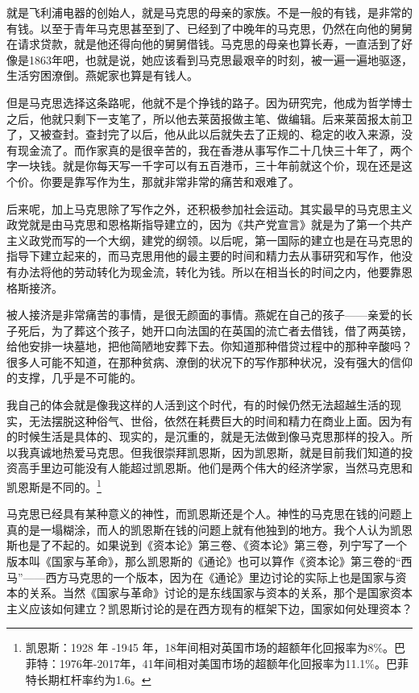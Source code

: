 \documentclass[UTF8, 12pt, a4paper]{ctexrep}
\begin{document}
就是飞利浦电器的创始人，就是马克思的母亲的家族。不是一般的有钱，是非常的有钱。以至于青年马克思甚至到了、已经到了中晚年的马克思，仍然在向他的舅舅在请求贷款，就是他还得向他的舅舅借钱。马克思的母亲也算长寿，一直活到了好像是1863年吧，也就是说，她应该看到马克思最艰辛的时刻，被一遍一遍地驱逐，生活穷困潦倒。燕妮家也算是有钱人。

但是马克思选择这条路呢，他就不是个挣钱的路子。因为研究完，他成为哲学博士之后，他就只剩下一支笔了，所以他去莱茵报做主笔、做编辑。后来莱茵报太前卫了，又被查封。查封完了以后，他从此以后就失去了正规的、稳定的收入来源，没有现金流了。而作家真的是很辛苦的，我在香港从事写作二十几快三十年了，两个字一块钱。就是你每天写一千字可以有五百港币，三十年前就这个价，现在还是这个价。你要是靠写作为生，那就非常非常的痛苦和艰难了。

后来呢，加上马克思除了写作之外，还积极参加社会运动。其实最早的马克思主义政党就是由马克思和恩格斯指导建立的，因为《共产党宣言》就是为了第一个共产主义政党而写的一个大纲，建党的纲领。以后呢，第一国际的建立也是在马克思的指导下建立起来的，而马克思用他的最主要的时间和精力去从事研究和写作，他没有办法将他的劳动转化为现金流，转化为钱。所以在相当长的时间之内，他要靠恩格斯接济。

被人接济是非常痛苦的事情，是很无颜面的事情。燕妮在自己的孩子——亲爱的长子死后，为了葬这个孩子，她开口向法国的在英国的流亡者去借钱，借了两英镑，给他安排一块墓地，把他简陋地安葬下去。你知道那种借贷过程中的那种辛酸吗？很多人可能不知道，在那种贫病、潦倒的状况下的写作那种状况，没有强大的信仰的支撑，几乎是不可能的。

我自己的体会就是像我这样的人活到这个时代，有的时候仍然无法超越生活的现实，无法摆脱这种俗气、世俗，依然在耗费巨大的时间和精力在商业上面。因为有的时候生活是具体的、现实的，是沉重的，就是无法做到像马克思那样的投入。所以我真诚地热爱马克思。但我很崇拜凯恩斯，因为凯恩斯，就是目前我们知道的投资高手里边可能没有人能超过凯恩斯。他们是两个伟大的经济学家，当然马克思和凯恩斯是不同的。\footnote{凯恩斯：1928 年 -1945 年，18年间相对英国市场的超额年化回报率为8\%。巴菲特：1976年-2017年，41年间相对美国市场的超额年化回报率为11.1\%。巴菲特长期杠杆率约为1.6。}

马克思已经具有某种意义的神性，而凯恩斯还是个人。神性的马克思在钱的问题上真的是一塌糊涂，而人的凯恩斯在钱的问题上就有他独到的地方。我个人认为凯恩斯也是了不起的。如果说到《资本论》第三卷、《资本论》第三卷，列宁写了一个版本叫《国家与革命》，那么凯恩斯的《通论》也可以算作《资本论》第三卷的“西马”——西方马克思的一个版本，因为在《通论》里边讨论的实际上也是国家与资本的关系。当然《国家与革命》讨论的是东线国家与资本的关系，那个是国家资本主义应该如何建立？凯恩斯讨论的是在西方现有的框架下边，国家如何处理资本？
\end{document}
